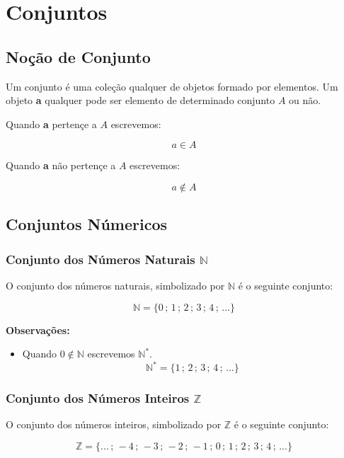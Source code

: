 \chapter{Conjuntos}

\section{Noção de Conjunto}


Um conjunto é uma coleção qualquer de objetos formado por elementos. Um objeto \textbf{a} qualquer pode ser elemento de determinado conjunto $A$ ou não.


\begin{center}
	Quando \textbf{a} pertençe a $A$ escrevemos:
\end{center}
 	$$a \in A$$
 	
\begin{center}
	Quando \textbf{a} não pertençe a $A$ escrevemos:
\end{center}
	$$a \not\in A$$
	
	
\section{Conjuntos Númericos}

\subsection{Conjunto  dos Números Naturais $\mathbb{N}$}

O conjunto dos números naturais, simbolizado por $\mathbb{N}$ é o seguinte conjunto:

$$\mathbb{N} = \{0 \, ; \, 1\, ; \,2\, ; \,3\, ; \,4\,; \, ...\}$$

\textbf{Observações:}
\begin{itemize}
\item Quando $0 \not\in \mathbb{N}$ escrevemos $\mathbb{N}^*$.
$$\mathbb{N}^* = \{ 1\, ; \,2\, ; \,3\, ; \,4\, ; \, ...\}$$

\end{itemize}

\subsection{Conjunto  dos Números Inteiros $\mathbb{Z}$}

O conjunto dos números inteiros, simbolizado por $\mathbb{Z}$ é o seguinte conjunto:

$$\mathbb{Z} = \{...\,;\,-4\,;\,-3\,;\,-2\,;\,-1\,;\,0 \, ; \, 1\, ; \,2\, ; \,3\, ; \,4\, ; \, ...\}$$


